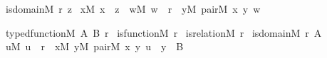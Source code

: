 \begin{isabelle}%
is{\isacharunderscore}{\kern0pt}domain{\isacharparenleft}{\kern0pt}M{\isacharcomma}{\kern0pt}\ r{\isacharcomma}{\kern0pt}\ z{\isacharparenright}{\kern0pt}\ {\isasymequiv}\isanewline
{\isasymforall}x{\isacharbrackleft}{\kern0pt}M{\isacharbrackright}{\kern0pt}{\isachardot}{\kern0pt}\ x\ {\isasymin}\ z\ {\isasymlongleftrightarrow}\ {\isacharparenleft}{\kern0pt}{\isasymexists}w{\isacharbrackleft}{\kern0pt}M{\isacharbrackright}{\kern0pt}{\isachardot}{\kern0pt}\ w\ {\isasymin}\ r\ {\isasymand}\ {\isacharparenleft}{\kern0pt}{\isasymexists}y{\isacharbrackleft}{\kern0pt}M{\isacharbrackright}{\kern0pt}{\isachardot}{\kern0pt}\ pair{\isacharparenleft}{\kern0pt}M{\isacharcomma}{\kern0pt}\ x{\isacharcomma}{\kern0pt}\ y{\isacharcomma}{\kern0pt}\ w{\isacharparenright}{\kern0pt}{\isacharparenright}{\kern0pt}{\isacharparenright}{\kern0pt}%
\end{isabelle}%
\begin{isabelle}%
typed{\isacharunderscore}{\kern0pt}function{\isacharparenleft}{\kern0pt}M{\isacharcomma}{\kern0pt}\ A{\isacharcomma}{\kern0pt}\ B{\isacharcomma}{\kern0pt}\ r{\isacharparenright}{\kern0pt}\ {\isasymequiv}\isanewline
is{\isacharunderscore}{\kern0pt}function{\isacharparenleft}{\kern0pt}M{\isacharcomma}{\kern0pt}\ r{\isacharparenright}{\kern0pt}\ {\isasymand}\isanewline
is{\isacharunderscore}{\kern0pt}relation{\isacharparenleft}{\kern0pt}M{\isacharcomma}{\kern0pt}\ r{\isacharparenright}{\kern0pt}\ {\isasymand}\isanewline
is{\isacharunderscore}{\kern0pt}domain{\isacharparenleft}{\kern0pt}M{\isacharcomma}{\kern0pt}\ r{\isacharcomma}{\kern0pt}\ A{\isacharparenright}{\kern0pt}\ {\isasymand}\isanewline
{\isacharparenleft}{\kern0pt}{\isasymforall}u{\isacharbrackleft}{\kern0pt}M{\isacharbrackright}{\kern0pt}{\isachardot}{\kern0pt}\ u\ {\isasymin}\ r\ {\isasymlongrightarrow}\ {\isacharparenleft}{\kern0pt}{\isasymforall}x{\isacharbrackleft}{\kern0pt}M{\isacharbrackright}{\kern0pt}{\isachardot}{\kern0pt}\ {\isasymforall}y{\isacharbrackleft}{\kern0pt}M{\isacharbrackright}{\kern0pt}{\isachardot}{\kern0pt}\ pair{\isacharparenleft}{\kern0pt}M{\isacharcomma}{\kern0pt}\ x{\isacharcomma}{\kern0pt}\ y{\isacharcomma}{\kern0pt}\ u{\isacharparenright}{\kern0pt}\ {\isasymlongrightarrow}\ y\ {\isasymin}\ B{\isacharparenright}{\kern0pt}{\isacharparenright}{\kern0pt}%
\end{isabelle}%
